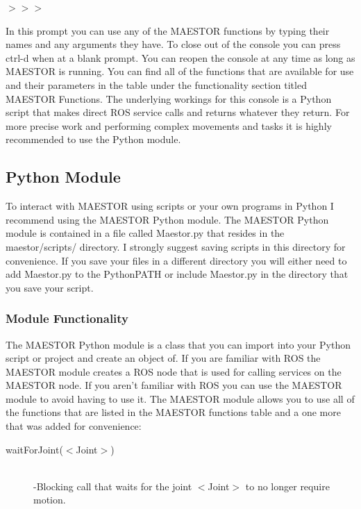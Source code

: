 \documentclass[12pt]{article}
\begin{document}
	\begin{center}
		$>>>$
	\end{center}
	
In this prompt you can use any of the MAESTOR functions by typing their names and any arguments they have. To close out of the console you can press ctrl-d when at a blank prompt. You can reopen the console at any time as long as MAESTOR is running. You can find all of the functions that are available for use and their parameters in the table under the functionality section titled MAESTOR Functions. The underlying workings for this console is a Python script that makes direct ROS service calls and returns whatever they return. For more precise work and performing complex movements and tasks it is highly recommended to use the Python module. 

\subsection{Python Module}

To interact with MAESTOR using scripts or your own programs in Python I recommend using the MAESTOR Python module. The MAESTOR Python module is contained in a file called Maestor.py that resides in the maestor/scripts/ directory. I strongly suggest saving scripts in this directory for convenience. If you save your files in a different directory you will either need to add Maestor.py to the PythonPATH or include Maestor.py in the directory that you save your script. 

\subsubsection{Module Functionality}

The MAESTOR Python module is a class that you can import into your Python script or project and create an object of. If you are familiar with ROS the  MAESTOR module creates a ROS node that is used for calling services on the MAESTOR node. If you aren't familiar with ROS you can use the MAESTOR module to avoid having to use it. The MAESTOR module allows you to use all of the functions that are listed in the MAESTOR functions table and a one more that was added for convenience: 

\begin{description}
	\item[waitForJoint($<$Joint$>$)] \hfill \\
	-Blocking call that waits for the joint $<$Joint$>$ to no longer require motion.
\end{description}
\end{document}
